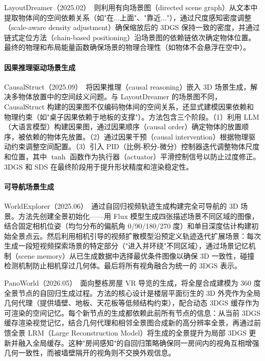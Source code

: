 LayoutDreamer（2025.02）~\cite{2502_01949}则利用有向场景图（directed scene graph）从文本中提取物体间的空间依赖关系（如"在...上面"、"靠近..."），通过尺度感知密度调整（scale-aware density adjustment）确保缩放后的 3DGS 保持一致的密度，并通过链式定位方法（chain-based positioning）沿场景图的依赖链依次确定物体位置。最终的物理和布局能量函数确保场景的物理合理性（如物体不会悬浮在空中）。

\paragraph{因果推理驱动场景生成}

CausalStruct（2025.09）~\cite{2509_15249}将因果推理（causal reasoning）嵌入 3D 场景生成，解决多物体放置中的空间歧义问题。与 LayoutDreamer 的场景图不同，CausalStruct 构建的因果图不仅编码物体间的空间关系，还显式建模因果依赖和物理约束（如"桌子因果依赖于地板的支撑"）。方法包含三个阶段。（1）利用 LLM（大语言模型）构建因果图，通过因果顺序（causal order）确定物体的放置顺序，被依赖的物体先放置。（2）通过因果干预（causal intervention）根据物理驱动约束调整空间配置。（3）引入 PID（比例-积分-微分）控制器迭代调整物体尺度和位置，其中 $\tanh$ 函数作为执行器（actuator）平滑控制信号以防止过度修正。3DGS 和 SDS 在最终阶段用于提升形状精度和渲染稳定性。

\paragraph{可导航场景生成}

WorldExplorer（2025.06）~\cite{2506_01799}通过自回归视频轨迹生成构建完全可导航的 3D 场景。方法先创建全景初始化——用 Flux 模型生成四张描述场景不同区域的图像，结合固定相机位姿（均匀分布的偏航角 0/90/180/270 度）和单目深度估计构建初始全景点云。然后利用相机引导的视频扩散模型沿预定义轨迹迭代扩展场景：每次生成一段短视频探索场景的特定部分（"进入并环绕"不同区域），通过场景记忆机制（scene memory）从已生成数据中选择最优条件图像以确保 3D 一致性，碰撞检测机制防止相机穿过几何体。最后将所有视角融合为统一的 3DGS 表示。

PanoWorld（2026.05）~\cite{2605_17916}面向整栋房屋 VR 导览的生成，将全屋合成建模为 360 度全景节点的自回归生成过程。方法的核心设计是楼层平面衍生的 3D 外壳作为全局几何代理（提供墙壁、地板、天花板等低频结构约束），配合动态 3DGS 缓存作为可渲染的空间记忆。每个新节点的生成都依赖此前所有节点的信息：从当前 3DGS 缓存渲染视觉记忆，结合几何代理和相邻全景图合成新的高分辨率全景，再通过前馈全景 LRM（Large Reconstruction Model）将生成的全景提升为局部 3DGS 更新并融入全局缓存。这种"房间感知"的自回归策略确保同一房间内的视角互相增强几何一致性，而被墙壁隔开的视角则不交换外观信息。


